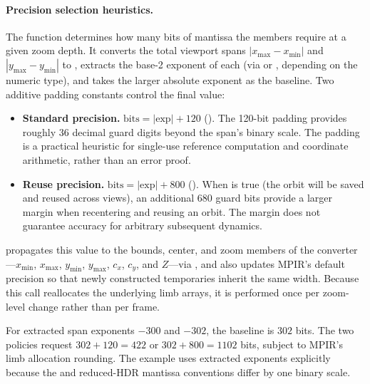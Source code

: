\paragraph{Precision selection heuristics.}
\label{par:precision-heuristics}
The function  determines how
many bits of mantissa the  members require at a
given zoom depth. It converts the total viewport spans
$|x_{\max}-x_{\min}|$ and $|y_{\max}-y_{\min}|$ to
, extracts the base-2 exponent
of each (via  or , depending on the
numeric type), and takes the larger absolute exponent as the baseline.
Two additive padding constants control the final value:
\begin{itemize}
  \item \textbf{Standard precision.}
        $\text{bits} = |\text{exp}| + 120$
        ().
        The 120-bit padding provides roughly 36 decimal guard digits
        beyond the span's binary scale. The padding is a practical heuristic
        for single-use reference computation and coordinate arithmetic, rather
        than an error proof.
  \item \textbf{Reuse precision.}
        $\text{bits} = |\text{exp}| + 800$
        ().
        When  is true (the orbit will be
        saved and reused across views), an additional 680 guard bits
        provide a larger margin when recentering and reusing an orbit. The
        margin does not guarantee accuracy for arbitrary subsequent dynamics.
\end{itemize}
 propagates this value to the bounds, center, and zoom
members of the converter---$x_{\min}$,
$x_{\max}$, $y_{\min}$, $y_{\max}$, $c_x$, $c_y$, and
$Z$---via , and also updates MPIR's default
precision so that newly constructed  temporaries inherit
the same width.  Because this call reallocates the underlying limb
arrays, it is performed once per zoom-level change rather than per
frame.

For extracted span exponents $-300$ and $-302$, the baseline is $302$ bits.
The two policies request $302+120=422$ or $302+800=1102$ bits, subject to MPIR's
limb allocation rounding. The example uses extracted exponents explicitly because
the  and reduced-HDR mantissa conventions differ by one binary scale.

